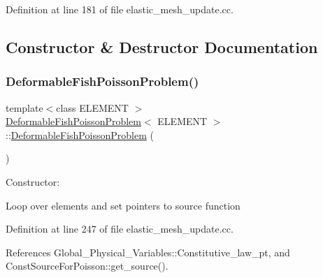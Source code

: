 Definition at line 181 of file elastic\+\_\+mesh\+\_\+update.\+cc.



\subsection{Constructor \& Destructor Documentation}
\mbox{\label{classDeformableFishPoissonProblem_a383952a668f3cec16b85c6b35f437ddd}} 
\subsubsection{\texorpdfstring{Deformable\+Fish\+Poisson\+Problem()}{DeformableFishPoissonProblem()}\hspace{0.1cm}{\footnotesize\ttfamily [1/2]}}
{\footnotesize\ttfamily template$<$class E\+L\+E\+M\+E\+NT $>$ \\
\hyperlink{classDeformableFishPoissonProblem}{Deformable\+Fish\+Poisson\+Problem}$<$ E\+L\+E\+M\+E\+NT $>$\+::\hyperlink{classDeformableFishPoissonProblem}{Deformable\+Fish\+Poisson\+Problem} (\begin{DoxyParamCaption}{ }\end{DoxyParamCaption})}



Constructor\+: 

Loop over elements and set pointers to source function 

Definition at line 247 of file elastic\+\_\+mesh\+\_\+update.\+cc.



References Global\+\_\+\+Physical\+\_\+\+Variables\+::\+Constitutive\+\_\+law\+\_\+pt, and Const\+Source\+For\+Poisson\+::get\+\_\+source().

\mbox{\label{classDeformableFishPoissonProblem_a383952a668f3cec16b85c6b35f437ddd}} 
